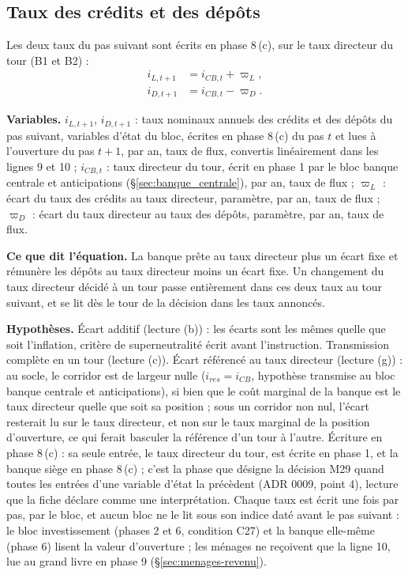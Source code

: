 \documentclass[11pt,a4paper]{article}
\newcommand{\variables}{\par\noindent\textbf{Variables.} }
\newcommand{\sens}{\par\noindent\textbf{Ce que dit l'équation.} }
\newcommand{\hyp}{\par\noindent\textbf{Hypothèses.} }
\begin{document}
\subsection{Taux des crédits et des dépôts}
\label{sec:banque-taux}
\begin{proposee}
Les deux taux du pas suivant sont écrits en phase 8\,(c), sur le taux directeur du tour (B1 et B2) :
\begin{align}
i_{L,t+1} &= i_{\mathit{CB},t} + \varpi_L , \tag{B1}\label{eq:banque-taux-credit} \\
i_{D,t+1} &= i_{\mathit{CB},t} - \varpi_D . \tag{B2}\label{eq:banque-taux-depots}
\end{align}
\begin{lecture}
\variables $i_{L,t+1}$, $i_{D,t+1}$ : taux nominaux annuels des crédits et des dépôts du pas suivant, variables d'état du bloc, écrites en phase 8\,(c) du pas $t$ et lues à l'ouverture du pas $t + 1$, par an, taux de flux, convertis linéairement dans les lignes 9 et 10 ; $i_{\mathit{CB},t}$ : taux directeur du tour, écrit en phase 1 par le bloc banque centrale et anticipations (\S\ref{sec:banque_centrale}), par an, taux de flux ; $\varpi_L$ : écart du taux des crédits au taux directeur, paramètre, par an, taux de flux ; $\varpi_D$ : écart du taux directeur au taux des dépôts, paramètre, par an, taux de flux.
\sens La banque prête au taux directeur plus un écart fixe et rémunère les dépôts au taux directeur moins un écart fixe. Un changement du taux directeur décidé à un tour passe entièrement dans ces deux taux au tour suivant, et se lit dès le tour de la décision dans les taux annoncés.
\hyp Écart additif (lecture (b)) : les écarts sont les mêmes quelle que soit l'inflation, critère de superneutralité écrit avant l'instruction. Transmission complète en un tour (lecture (c)). Écart référencé au taux directeur (lecture (g)) : au socle, le corridor est de largeur nulle ($i_{\mathit{res}} = i_{\mathit{CB}}$, hypothèse transmise au bloc banque centrale et anticipations), si bien que le coût marginal de la banque est le taux directeur quelle que soit sa position ; sous un corridor non nul, l'écart resterait lu sur le taux directeur, et non sur le taux marginal de la position d'ouverture, ce qui ferait basculer la référence d'un tour à l'autre. Écriture en phase 8\,(c) : sa seule entrée, le taux directeur du tour, est écrite en phase 1, et la banque siège en phase 8\,(c) ; c'est la phase que désigne la décision M29 quand toutes les entrées d'une variable d'état la précèdent (ADR 0009, point 4), lecture que la fiche déclare comme une interprétation. Chaque taux est écrit une fois par pas, par le bloc, et aucun bloc ne le lit sous son indice daté avant le pas suivant : le bloc investissement (phases 2 et 6, condition C27) et la banque elle-même (phase 6) lisent la valeur d'ouverture ; les ménages ne reçoivent que la ligne 10, lue au grand livre en phase 9 (\S\ref{sec:menages-revenu}).

\end{lecture}
\end{proposee}
\end{document}
